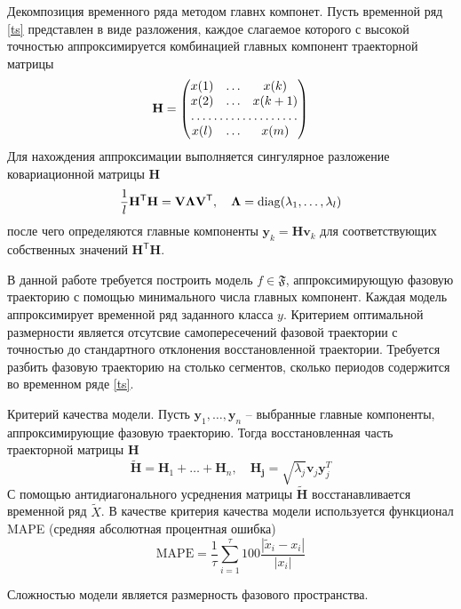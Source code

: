 \documentclass[12pt, twoside]{article}
\begin{document}
Декомпозиция временного ряда методом главнх компонет. Пусть временной ряд \eqref{ts} представлен в виде разложения, каждое слагаемое которого с высокой точностью аппроксимируется комбинацией главных компонент траекторной матрицы
    \[ \mathbf{H} = \begin{pmatrix}
                        x(1) & \dots & x(k) \\
                        x(2) & \dots & x(k+1) \\
                        \hdotsfor{3} \\
                        x(l) & \dots & x(m)
                    \end{pmatrix}\]
Для нахождения аппроксимации выполняется сингулярное разложение ковариационной матрицы $\mathbf{H}$
    \[ \frac{1}{l}\mathbf{H}^{\mathsf{T}}\mathbf{H} = \mathbf{V}\mathbf{\Lambda}\mathbf{V}^{\mathsf{T}}, \quad \mathbf{\Lambda} = \diag(\lambda_1,\dots,\lambda_l) \]
    после чего определяются главные компоненты $\mathbf{y}_k = \mathbf{Hv}_k$ для соответствующих собственных значений $\mathbf{H}^{\mathsf{T}}\mathbf{H}$.

В данной работе требуется построить модель $f\in\mathfrak{F}$, аппроксимирующую фазовую траекторию с помощью минимального числа главных компонент. Каждая модель аппроксимирует временной ряд заданного класса $y$. Критерием оптимальной размерности является отсутсвие самопересечений фазовой траектории с точностью до стандартного отклонения восстановленной траектории. Требуется разбить фазовую траекторию на столько сегментов, сколько периодов содержится во временном ряде \eqref{ts}.
    \begin{figure}[ht]
    \end{figure}

Критерий качества модели. Пусть $\mathbf{y}_1,\dots,\mathbf{y}_n$ -- выбранные главные компоненты, аппроксимирующие фазовую траекторию. Тогда восстановленная часть траекторной матрицы $\mathbf{H}$
    \[ \mathbf{\tilde{H}} = \mathbf{H}_1  + \dots + \mathbf{H}_n, \quad \mathbf{H_j} = \sqrt{\lambda_j}\mathbf{v}_j\mathbf{y}_j^T\]
С помощью антидиагонального усреднения матрицы $\mathbf{\tilde{H}}$ восстанавливается временной ряд $\tilde{X}$. В качестве критерия качества модели используется функционал MAPE (средняя абсолютная процентная ошибка)
    \[ \text{MAPE} = \frac{1}{\tau}\sum_{i = 1}^{\tau}100\frac{|\tilde{x}_i - x_i|}{|x_i|} \]
    
Сложностью модели является размерность фазового пространства.
    \begin{figure}[ht]
    \end{figure}
 
\end{document}
